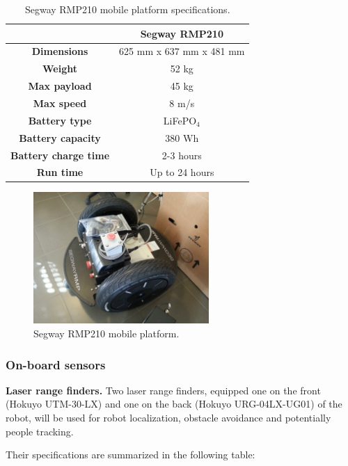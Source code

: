 \begin{table}[h!]
\begin{center}
\begin{tabular}{|c|c|}
\hline 
& \bf{Segway RMP210}\\
\hline \bf{Dimensions } & 625 mm x 637 mm x 481 mm \\
\hline \bf{ Weight } & 52 kg \\
\hline \bf{ Max payload } & 45 kg \\
\hline \bf{ Max speed } & 8 m/s \\
\hline \bf{ Battery type } & LiFePO$_4$ \\
\hline \bf{ Battery capacity } & 380 Wh \\
\hline \bf{ Battery charge time } & 2-3 hours \\
\hline \bf{ Run time } & Up to 24 hours \\
\hline
\end{tabular}
\end{center}
\caption{Segway RMP210 mobile platform specifications.}
\end{table}

\begin{figure}[h!]
\begin{center}
\includegraphics[height=5cm]{fig/segway_rmp210.jpg}
\end{center}
\caption{Segway RMP210 mobile platform.}
\label{fig:segway}
\end{figure}

\subsubsection{On-board sensors}

{\bf Laser range finders.} Two laser range finders, equipped one on the
front (Hokuyo UTM-30-LX) and one on the back (Hokuyo URG-04LX-UG01) of the
robot, will be used for robot localization, obstacle avoidance and
potentially people tracking.

Their specifications are summarized in the following table:

